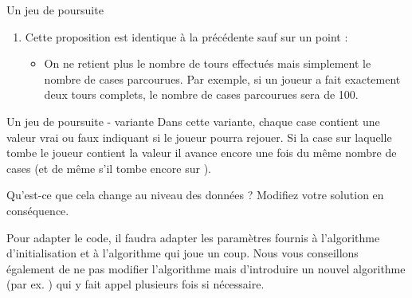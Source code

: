 \begin{Exercice}{Un jeu de poursuite}
\begin{enumerate}
	\item
		Cette proposition est identique à la précédente sauf sur un point :
		\begin{itemize}
		\item
			On ne retient plus le nombre de tours effectués
			mais simplement le nombre de cases parcourues.
			Par exemple, si un joueur a fait exactement deux tours complets,
			le nombre de cases parcourues sera de 100.
			\begin{algo}
			\end{algo}
		\end{itemize}
	\end{enumerate}	
\end{Exercice}

\begin{Exercice}{Un jeu de poursuite - variante}
	Dans cette variante,
	chaque case contient une valeur vrai ou faux
	indiquant si le joueur pourra rejouer.
	Si la case sur laquelle tombe le joueur contient la valeur
	 il avance encore une fois du même nombre de cases 
	(et de même s’il tombe encore sur ).
	
	Qu'est-ce que cela change au niveau des données ?
	Modifiez votre solution en conséquence.
	
	Pour adapter le code,
	il faudra adapter les paramètres fournis à l'algorithme d'initialisation
	et à l'algorithme qui joue un coup.
	Nous vous conseillons également de ne pas modifier l'algorithme  
	mais d'introduire un nouvel algorithme (par ex. ) 
	qui y fait appel plusieurs fois si nécessaire.
\end{Exercice}

